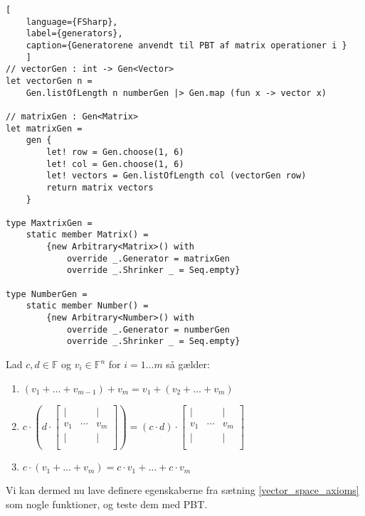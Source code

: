 \begin{lstlisting}[
    language={FSharp}, 
    label={generators}, 
    caption={Generatorene anvendt til PBT af matrix operationer i }
    ]
// vectorGen : int -> Gen<Vector>
let vectorGen n =
    Gen.listOfLength n numberGen |> Gen.map (fun x -> vector x)

// matrixGen : Gen<Matrix>
let matrixGen =
    gen {
        let! row = Gen.choose(1, 6)
        let! col = Gen.choose(1, 6)
        let! vectors = Gen.listOfLength col (vectorGen row)
        return matrix vectors
    }

type MaxtrixGen =
    static member Matrix() =
        {new Arbitrary<Matrix>() with
            override _.Generator = matrixGen
            override _.Shrinker _ = Seq.empty}

type NumberGen =
    static member Number() =
        {new Arbitrary<Number>() with
            override _.Generator = numberGen
            override _.Shrinker _ = Seq.empty}   
\end{lstlisting}
\begin{egenskab}\label{vector_space_axioms}
    Lad $c, d \in \mathbb{F}$ og $v_i \in \mathbb{F}^n$ for $i = 1 \dots m$ så gælder:
    \begin{enumerate}
        \item $(v_1 + \dots + v_{m-1}) + v_m = v_1 + (v_2 + \dots + v_m)$
        \item $c \cdot \left(d \cdot \begin{bmatrix}
            | &        & | \\
            v_{1} & \cdots & v_{m} \\
            | &        & | \\
        \end{bmatrix}\right) = (c \cdot d) \cdot \begin{bmatrix}
            | &        & | \\
            v_{1} & \cdots & v_{m} \\
            | &        & | \\
        \end{bmatrix}$
        
        \item $c \cdot (v_1 + \dots +v_m) = c \cdot v_1 + \dots +c \cdot v_m$
    \end{enumerate}
\end{egenskab}

Vi kan dermed nu lave definere egenskaberne fra sætning \ref{vector_space_axioms} som nogle funktioner, og teste dem med PBT.


